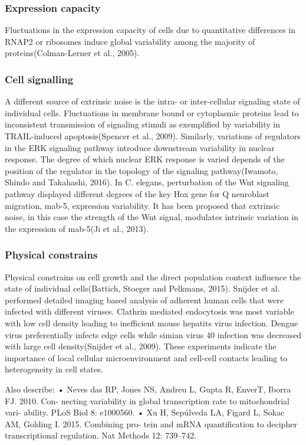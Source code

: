\subsubsection{Expression capacity}

Fluctuations in the expression capacity of cells due to quantitative differences in RNAP2 or ribosomes induce global variability among the majority of proteins(Colman-Lerner et al., 2005).

\subsubsection{Cell signalling}

A different source of extrinsic noise is the intra- or inter-cellular signaling state of individual cells. Fluctuations in membrane bound or cytoplasmic proteins lead to inconsistent transmission of signaling stimuli as exemplified by variability in TRAIL-induced apoptosis(Spencer et al., 2009). Similarly, variations of regulators in the ERK signaling pathway introduce downstream variability in nuclear response. The degree of which nuclear ERK response is varied depends of the position of the regulator in the topology of the signaling pathway(Iwamoto, Shindo and Takahashi, 2016). In C. elegans, perturbation of the Wnt signaling pathway displayed different degrees of the key Hox gene for Q neuroblast migration, mab-5, expression variability. It has been proposed that extrinsic noise, in this case the strength of the Wnt signal, modulates intrinsic variation in the expression of mab-5(Ji et al., 2013). 

\subsubsection{Physical constrains}

Physical constrains on cell growth and the direct population context influence the state of individual cells(Battich, Stoeger and Pelkmans, 2015). Snijder et al. performed detailed imaging based analysis of adherent human cells that were infected with different viruses. Clathrin mediated endocytosis was most variable with low cell density leading to inefficient mouse hepatits virus infection. Dengue virus preferentially infects edge cells while simian virus 40 infection was decreased with large cell density(Snijder et al., 2009). These experiments indicate the importance of local cellular microenvironment and cell-cell contacts leading to heterogeneity in cell states. 

Also describe:
•	Neves das RP, Jones NS, Andreu L, Gupta R, EnverT, Iborra FJ. 2010. Con- necting variability in global transcription rate to mitochondrial vari- ability. PLoS Biol 8: e1000560.
•	Xu H, Sepúlveda LA, Figard L, Sokac AM, Golding I. 2015. Combining pro- tein and mRNA quantification to decipher transcriptional regulation. Nat Methods 12: 739–742.
